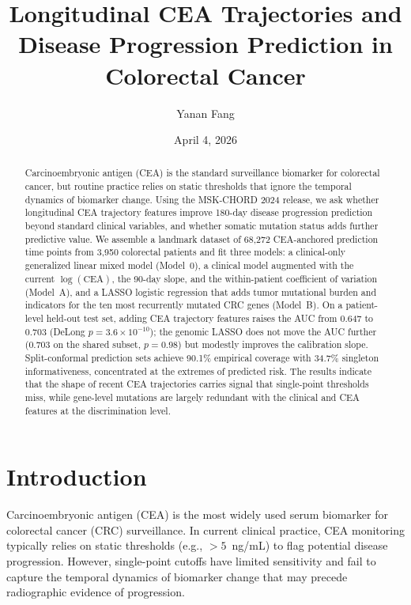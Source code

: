 \documentclass[11pt]{article}
\title{Longitudinal CEA Trajectories and Disease Progression Prediction in Colorectal Cancer}
\author{Yanan Fang}
\date{April 4, 2026}
\begin{document}
\maketitle

\begin{abstract}
\noindent
Carcinoembryonic antigen (CEA) is the standard surveillance biomarker for colorectal cancer, but routine practice relies on static thresholds that ignore the temporal dynamics of biomarker change. Using the MSK-CHORD 2024 release, we ask whether longitudinal CEA trajectory features improve 180-day disease progression prediction beyond standard clinical variables, and whether somatic mutation status adds further predictive value. We assemble a landmark dataset of 68{,}272 CEA-anchored prediction time points from 3{,}950 colorectal patients and fit three models: a clinical-only generalized linear mixed model (Model~0), a clinical model augmented with the current $\log(\text{CEA})$, the 90-day slope, and the within-patient coefficient of variation (Model~A), and a LASSO logistic regression that adds tumor mutational burden and indicators for the ten most recurrently mutated CRC genes (Model~B). On a patient-level held-out test set, adding CEA trajectory features raises the AUC from 0.647 to 0.703 (DeLong $p = 3.6 \times 10^{-10}$); the genomic LASSO does not move the AUC further (0.703 on the shared subset, $p = 0.98$) but modestly improves the calibration slope. Split-conformal prediction sets achieve 90.1\% empirical coverage with 34.7\% singleton informativeness, concentrated at the extremes of predicted risk. The results indicate that the shape of recent CEA trajectories carries signal that single-point thresholds miss, while gene-level mutations are largely redundant with the clinical and CEA features at the discrimination level.
\end{abstract}

\section{Introduction}

Carcinoembryonic antigen (CEA) is the most widely used serum biomarker for colorectal cancer (CRC) surveillance. In current clinical practice, CEA monitoring typically relies on static thresholds (e.g., $>5$~ng/mL) to flag potential disease progression. However, single-point cutoffs have limited sensitivity and fail to capture the temporal dynamics of biomarker change that may precede radiographic evidence of progression.
\end{document}
